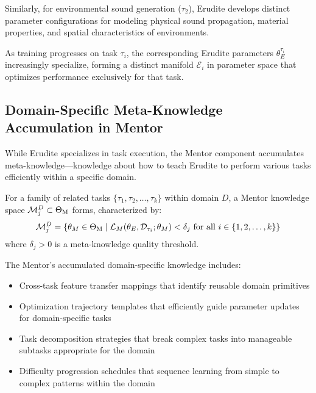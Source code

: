 Similarly, for environmental sound generation ($\tau_2$), Erudite develops distinct parameter configurations for modeling physical sound propagation, material properties, and spatial characteristics of environments.

\begin{proposition}
As training progresses on task $\tau_i$, the corresponding Erudite parameters $\theta_E^{\tau_i}$ increasingly specialize, forming a distinct manifold $\mathcal{E}_i$ in parameter space that optimizes performance exclusively for that task.
\end{proposition}

\subsection{Domain-Specific Meta-Knowledge Accumulation in Mentor}

While Erudite specializes in task execution, the Mentor component accumulates meta-knowledge—knowledge about how to teach Erudite to perform various tasks efficiently within a specific domain.

\begin{definition}
For a family of related tasks $\{\tau_1, \tau_2, \ldots, \tau_k\}$ within domain $D$, a Mentor knowledge space $\mathcal{M}_j^D \subset \Theta_{\text{M}}$ forms, characterized by:
\begin{equation}
\mathcal{M}_j^D = \{\theta_M \in \Theta_{\text{M}} \mid \mathcal{L}_M(\theta_E, \mathcal{D}_{\tau_i}; \theta_M) < \delta_j \text{ for all } i \in \{1,2,\ldots,k\}\}
\end{equation}
where $\delta_j > 0$ is a meta-knowledge quality threshold.
\end{definition}

The Mentor's accumulated domain-specific knowledge includes:
\begin{itemize}
    \item Cross-task feature transfer mappings that identify reusable domain primitives
    \item Optimization trajectory templates that efficiently guide parameter updates for domain-specific tasks
    \item Task decomposition strategies that break complex tasks into manageable subtasks appropriate for the domain
    \item Difficulty progression schedules that sequence learning from simple to complex patterns within the domain
\end{itemize}

